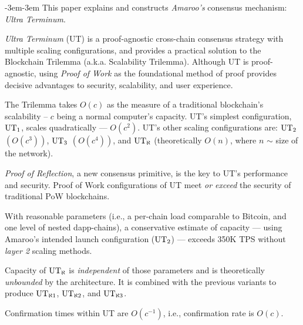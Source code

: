 \begin{adjustwidth}{-3em}{-3em}%
%
This paper explains and constructs \emph{Amaroo's} consensus mechanism: \emph{Ultra Terminum}.

\emph{Ultra Terminum} (UT) is a proof-agnostic cross-chain consensus strategy with multiple scaling configurations, and provides a practical solution to the Blockchain Trilemma (a.k.a. Scalability Trilemma).
Although UT is proof-agnostic, using \emph{Proof of Work} as the foundational method of proof provides decisive advantages to security, scalability, and user experience.

The Trilemma takes $O(c)$ as the measure of a traditional blockchain's scalability -- $c$ being a normal computer's capacity.
UT's simplest configuration, $\text{UT}_{1}$, scales quadratically --- $O(c^2)$.
UT's other scaling configurations are: $\text{UT}_{2}$ $(O(c^3))$, $\text{UT}_{3}$ $(O(c^4))$, and $\UTinf{}$ (theoretically $O(n)$, where $n$ $\sim$ size of the network).
\par
\emph{Proof of Reflection}, a new consensus primitive, is the key to UT's performance and security.
Proof of Work configurations of UT meet \emph{or exceed} the security of traditional PoW blockchains.
\par
With reasonable parameters (i.e., a per-chain load comparable to Bitcoin, and one level of nested dapp-chains), a conservative estimate of capacity --- using Amaroo's intended launch configuration ($\text{UT}_{2}$) --- exceeds 350K TPS without \emph{layer 2} scaling methods.
\par
Capacity of $\UTinf{}$ is \emph{independent} of those parameters and is theoretically \emph{unbounded} by the architecture.
It is combined with the previous variants to produce $\UTinf{1}$, $\UTinf{2}$, and $\UTinf{3}$.
\par
Confirmation times within UT are $O(c^{-1})$, i.e., confirmation rate is $O(c)$.

\end{adjustwidth}
